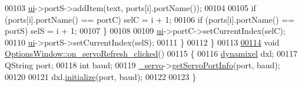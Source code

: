 \begin{DoxyCode}
00103             \hyperlink{a00005_a8347442d5b3b670e8fff0c4102db1f88}{ui}->portS->addItem(text, ports[i].portName());
00104             
00105             \textcolor{keywordflow}{if} (ports[i].portName() == portC) selC = i + 1;
00106             \textcolor{keywordflow}{if} (ports[i].portName() == portS) selS = i + 1;
00107         \}
00108 
00109         \hyperlink{a00005_a8347442d5b3b670e8fff0c4102db1f88}{ui}->portC->setCurrentIndex(selC);
00110         \hyperlink{a00005_a8347442d5b3b670e8fff0c4102db1f88}{ui}->portS->setCurrentIndex(selS);
00111     \}
00112 \}
00113 
\hypertarget{a00017_source_l00114}{}\hyperlink{a00005_ad5365d452e8bcd86cbb64b9ec42c3b7e}{00114} \textcolor{keywordtype}{void} \hyperlink{a00005_ad5365d452e8bcd86cbb64b9ec42c3b7e}{OptionsWindow::on\_servoRefresh\_clicked}()
00115 \{
00116     \hyperlink{a00003}{dynamixel} dxl;
00117     QString port;
00118     \textcolor{keywordtype}{int} baud;
00119     \hyperlink{a00005_acba1566fea3f831000d5e1c1edc3e776}{\_servo}->\hyperlink{a00007_afcf834d93f1ac9663d6ebaab820e5f74}{getServoPortInfo}(port, baud);
00120     
00121     dxl.\hyperlink{a00003_a87960244d5846ae7583e37d2407eb61e}{initialize}(port, baud);
00122     
00123 \}
\end{DoxyCode}
